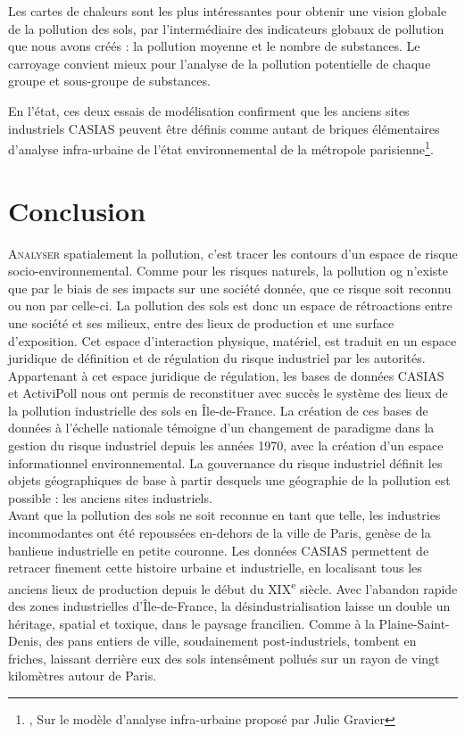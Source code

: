 \documentclass[a4paper,twoside,12pt]{book}
\newcommand{\siecle}[1]{\textsc{#1}\textsuperscript{e} siècle}
\begin{document}
Les cartes de chaleurs sont les plus intéressantes pour obtenir une vision globale de la pollution des sols, par l'intermédiaire des indicateurs globaux de pollution que nous avons créés : la pollution moyenne et le nombre de substances. Le carroyage convient mieux pour l'analyse de la pollution potentielle de chaque groupe et sous-groupe de substances.

En l'état, ces deux essais de modélisation confirment que les anciens sites industriels CASIAS peuvent être définis comme autant de briques élémentaires d'analyse infra-urbaine de l'état environnemental de la métropole parisienne\footnote{\cite{gravier_deux_2018}, Sur le modèle d'analyse infra-urbaine proposé par Julie Gravier }.

\chapter*{Conclusion}

\lettrine{A}{nalyser} spatialement la pollution, c'est tracer les contours d'un espace de risque socio-environnemental.  Comme pour les risques naturels, la pollution og{} n'existe \fg{} que par le biais de ses impacts sur une société donnée, que ce risque soit reconnu ou non par celle-ci. La pollution des sols est donc un espace de rétroactions entre une société et ses milieux, entre des lieux de production et une surface d'exposition. Cet espace d'interaction physique, matériel, est traduit en un espace juridique de définition et de régulation du risque industriel par les autorités. Appartenant à cet espace juridique de régulation, les bases de données CASIAS et ActiviPoll nous ont permis de reconstituer avec succès le système des lieux de la pollution industrielle des sols en Île-de-France. La création de ces bases de données à l'échelle nationale témoigne d'un changement de paradigme dans la gestion du risque industriel depuis les années 1970, avec la création d'un espace informationnel environnemental. La gouvernance du risque industriel définit les objets géographiques de base à partir desquels une géographie de la pollution est possible : les anciens sites industriels. \\

Avant que la pollution des sols ne soit reconnue en tant que telle, les industries incommodantes ont été repoussées en-dehors de la ville de Paris, genèse de la banlieue industrielle en petite couronne. Les données CASIAS permettent de retracer finement cette histoire urbaine et industrielle, en localisant tous les anciens lieux de production depuis le début du \siecle{XIX}. Avec l'abandon rapide des zones industrielles d'Île-de-France, la désindustrialisation laisse un double un héritage, spatial et toxique, dans le paysage francilien. Comme à la Plaine-Saint-Denis, des pans entiers de ville, soudainement post-industriels, tombent en friches, laissant derrière eux des sols intensément pollués sur un rayon de vingt kilomètres autour de Paris.  \\
\end{document}
